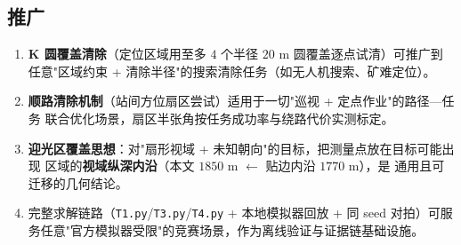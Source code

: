 \subsection{推广}

\begin{enumerate}
  \item \textbf{K 圆覆盖清除}（定位区域用至多 $4$ 个半径 $20$ m 圆覆盖逐点试清）可推广到
        任意"区域约束 + 清除半径"的搜索清除任务（如无人机搜索、矿难定位）。
  \item \textbf{顺路清除机制}（站间方位扇区尝试）适用于一切"巡视 + 定点作业"的路径—任务
        联合优化场景，扇区半张角按任务成功率与绕路代价实测标定。
  \item \textbf{迎光区覆盖思想}：对"扇形视域 + 未知朝向"的目标，把测量点放在目标可能出现
        区域的\textbf{视域纵深内沿}（本文 $1850$ m $\leftarrow$ 贴边内沿 $1770$ m），是
        通用且可迁移的几何结论。
  \item 完整求解链路（\texttt{T1.py}/\texttt{T3.py}/\texttt{T4.py} + 本地模拟器回放 + 同
        seed 对拍）可服务任意"官方模拟器受限"的竞赛场景，作为离线验证与证据链基础设施。
\end{enumerate}